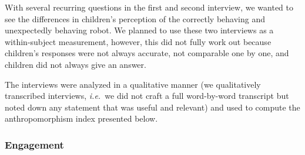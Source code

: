 \documentclass{sig-alternate}
\newcommand{\eg}{{\textit{e.g.~}}}
\newcommand{\ie}{{\textit{i.e.~}}}
\begin{document}
With several recurring questions in the first and second interview, we wanted to
see the differences in children's perception of the correctly behaving and
unexpectedly behaving robot. We planned to use these two interviews as a
within-subject measurement, however, this did not fully work out because
children's responses were not always accurate, not comparable one by one, and
children did not always give an answer.	



The interviews were analyzed in a qualitative manner (we qualitatively
transcribed interviews, \ie we did not craft a full word-by-word transcript but
noted down any statement that was useful and relevant) and used to compute the
anthropomorphism index presented below.

\subsubsection{Engagement}

%
%
\end{document}
